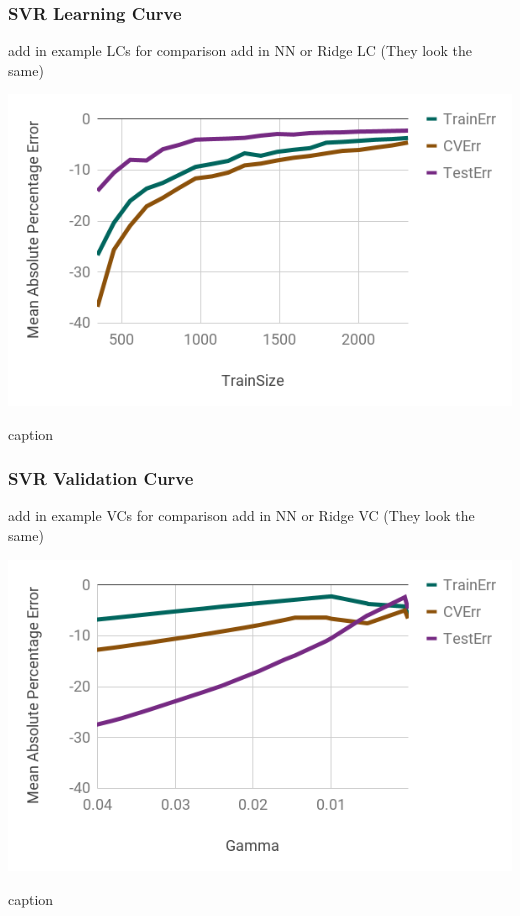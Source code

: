 
\begin{frame}
  \frametitle{SVR Learning Curve}
  add in example LCs for comparison
  add in NN or Ridge LC (They look the same)
  \begin{table}
    \centering
    \includegraphics[height=0.7\textheight]{./figures/lc1.png}
    \caption{caption}
  \end{table}
\end{frame}

\begin{frame}
  \frametitle{SVR Validation Curve}
  add in example VCs for comparison
  add in NN or Ridge VC (They look the same)
  \begin{table}
    \centering
    \includegraphics[height=0.7\textheight]{./figures/vc1.png}
    \caption{caption}
  \end{table}
\end{frame}

